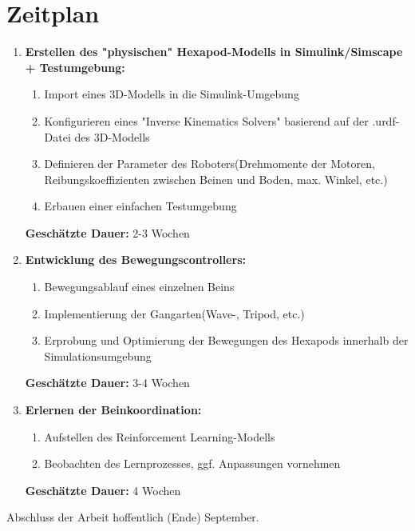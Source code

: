 \section{Zeitplan}
\begin{enumerate}
	\item \textbf{Erstellen des "physischen" Hexapod-Modells in Simulink/Simscape + Testumgebung:}
	\begin{enumerate}[label*=\arabic*.]
		\item Import eines 3D-Modells in die Simulink-Umgebung
		\item Konfigurieren eines "Inverse Kinematics Solvers" basierend auf der .urdf-Datei des 3D-Modells
		\item Definieren der Parameter des Roboters(Drehmomente der Motoren, Reibungskoeffizienten zwischen Beinen und Boden, max. Winkel, etc.)
		\item Erbauen einer einfachen Testumgebung
	\end{enumerate}
	\textbf{Geschätzte Dauer:} 2-3 Wochen
	
	\item \textbf{Entwicklung des Bewegungscontrollers:}
	\begin{enumerate}[label*=\arabic*.]
		\item Bewegungsablauf eines einzelnen Beins
		\item Implementierung der Gangarten(Wave-, Tripod, etc.)	
		\item Erprobung und Optimierung der Bewegungen des Hexapods innerhalb der Simulationsumgebung
	\end{enumerate}
	\textbf{Geschätzte Dauer:} 3-4 Wochen
	
	\item \textbf{Erlernen der Beinkoordination:}
	\begin{enumerate}[label*=\arabic*.]
		\item Aufstellen des Reinforcement Learning-Modells
		\item Beobachten des Lernprozesses, ggf. Anpassungen vornehmen
	\end{enumerate}
	\textbf{Geschätzte Dauer:} 4 Wochen
	

\end{enumerate}


Abschluss der Arbeit hoffentlich (Ende) September.